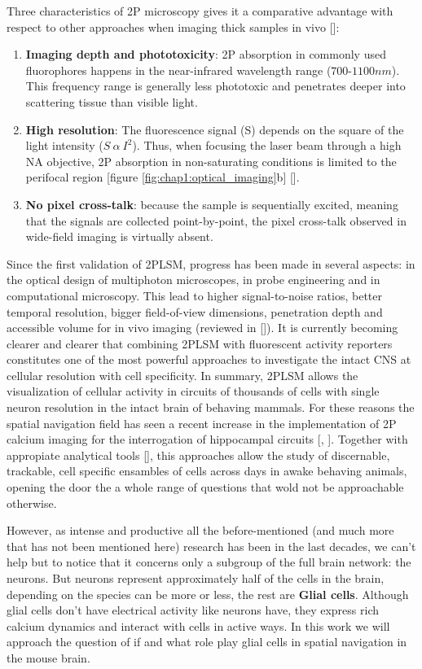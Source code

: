 Three characteristics of 2P microscopy gives it a comparative advantage with respect to other approaches when imaging thick samples in vivo [\cite{helmchen2005}]: 
\begin{enumerate}
    \item \textbf{Imaging depth and phototoxicity}: 2P absorption in commonly used fluorophores happens in the near-infrared wavelength range ($700$-$1100 nm$). This frequency range is generally less phototoxic and penetrates deeper into scattering tissue than visible light.
    \item \textbf{High resolution}: The fluorescence signal (S) depends on the square of the light intensity ($S\ \alpha \ I^2$). Thus, when focusing the laser beam through a high NA objective, 2P absorption in non-saturating conditions is limited to the perifocal region [figure \ref{fig:chap1:optical_imaging}b] [\cite{nagy2005}].
    \item \textbf{No pixel cross-talk}: because the sample is sequentially excited, meaning that the signals are collected point-by-point, the pixel cross-talk observed in wide-field imaging is virtually absent.
\end{enumerate}

Since the first validation of 2PLSM, progress has been made in several aspects: in the optical design of multiphoton microscopes, in probe engineering and in computational microscopy. 
This lead to higher signal-to-noise ratios, better temporal resolution, bigger field-of-view dimensions, penetration depth and accessible volume for in vivo imaging (reviewed in [\cite{yang2017}]). 
It is currently becoming clearer and clearer that combining 2PLSM with fluorescent activity reporters constitutes one of the most powerful approaches to investigate the intact CNS at cellular resolution with cell specificity.
In summary, 2PLSM allows the visualization of cellular activity in circuits of thousands of cells with single neuron resolution in the intact brain of behaving mammals. 
For these reasons the spatial navigation field has seen a recent increase in the implementation of 2P calcium imaging for the interrogation of hippocampal circuits [\cite{gauthier2018}, \cite{rubin2015}].
Together with appropiate analytical tools [\cite{sheintuch2017}], this approaches allow the study of discernable, trackable, cell specific ensambles of cells across days in awake behaving animals, opening the door the a whole range of questions that wold not be approachable otherwise. 

However, as intense and productive all the before-mentioned (and much more that has not been mentioned here) research has been in the last decades, we can't help but to notice that it concerns only a subgroup of the full brain network: the neurons.
But neurons represent approximately half of the cells in the brain, depending on the species can be more or less, the rest are \textbf{Glial cells}.
Although glial cells don't have electrical activity like neurons have, they express rich calcium dynamics and interact with cells in active ways. 
In this work we will approach the question of if and what role play glial cells in spatial navigation in the mouse brain. 

